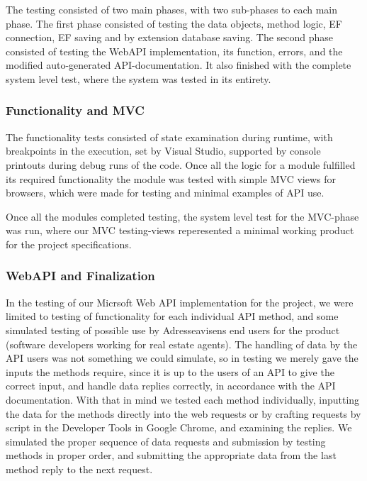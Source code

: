 The testing consisted of two main phases, with two sub-phases to each main phase. The first phase consisted of testing the data objects, method logic, EF connection,
EF saving and by extension database saving.
The second phase consisted of testing the WebAPI implementation, its function, errors, and the modified auto-generated API-documentation. It also finished with the
complete system level test, where the system was tested in its entirety.

\subsubsection{Functionality and MVC}

The functionality tests consisted of state examination during runtime, with breakpoints in the execution, set by Visual Studio, supported by console printouts
during debug runs of the code. Once all the logic for a module fulfilled its required functionality the module was tested with simple MVC views for browsers, 
which were made for testing and minimal examples of API use.

Once all the modules completed testing, the system level test for the MVC-phase was run, where our MVC testing-views reperesented a minimal working product for
the project specifications.

\subsubsection{WebAPI and Finalization}

In the testing of our Micrsoft Web API implementation for the project, we were limited to testing of functionality for each individual API method, and
some simulated testing of possible use by Adresseavisens end users for the product (software developers working for real estate agents).
The handling of data by the API users was not something we could simulate, so in testing we merely gave the inputs the methods require, since it is up to
the users of an API to give the correct input, and handle data replies correctly, in accordance with the API documentation.
With that in mind we tested each method individually, inputting the data for the methods directly into the web requests or by crafting requests by script in
the Developer Tools in Google Chrome, and examining the replies. 
We simulated the proper sequence of data requests and submission by testing methods in proper order, and submitting the appropriate data from the last method reply
to the next request.

